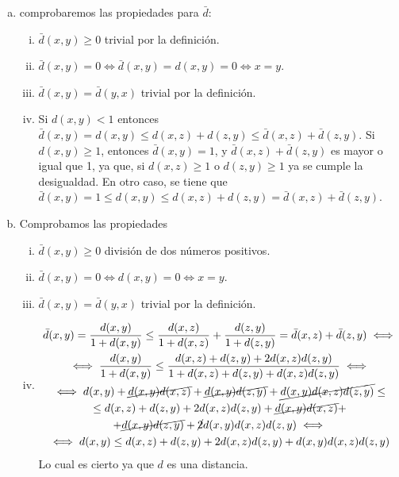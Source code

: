 \begin{ej}
	\begin{enumerate}[(a)]
		\item comprobaremos las propiedades para $\bar{d}$:
			\begin{enumerate}[i)]
				\item $\bar{d}(x,y) \geq 0$ trivial por la definición.
				\item $\bar{d}(x,y) = 0 \iff \bar{d}(x,y) = d(x,y) = 0 \iff x = y$.
				\item $\bar{d}(x,y) = \bar{d}(y,x)$ trivial por la definición.
				\item Si $d(x,y) < 1$ entonces $\bar{d}(x,y) = d(x,y) \leq d(x,z) + d(z,y) \leq \bar{d}(x,z) + \bar{d}(z,y)$. Si $d(x,y) \geq 1$,
					entonces $\bar{d}(x,y) = 1$, y $\bar{d}(x,z) + \bar{d}(z,y)$ es mayor o igual que 1, ya que, si $d(x,z) \geq 1$ o
					$d(z,y) \geq 1$ ya se cumple la desigualdad. En otro caso, se tiene que $\bar{d}(x,y) = 1 \leq d(x,y) \leq d(x,z) + d(z,y) =
					\bar{d}(x,z) + \bar{d}(z,y)$.
			\end{enumerate}
		\item Comprobamos las propiedades
			\begin{enumerate}[i)]
				\item $\bar{d}(x,y) \geq 0$ división de dos números positivos.
				\item $\bar{d}(x,y) = 0 \iff d(x,y) = 0 \iff x = y$.
				\item $\bar{d}(x,y) = \bar{d}(y,x)$ trivial por la definición.
				\item 
					\begin{gather*}
						\bar{d}(x,y) = \frac{d(x,y)}{1 + d(x,y)} \leq \frac{d(x,z)}{1 + d(x,z)} + \frac{d(z,y)}{1 + d(z,y)} =
						\bar{d}(x,z) + \bar{d}(z,y) \iff \\ \iff
						\frac{d(x,y)}{1+d(x,y)} \leq \frac{d(x,z) + d(z,y) + 2d(x,z)d(z,y)}{1 + d(x,z) + d(z,y) + d(x,z)d(z,y)} \iff \\ \iff
						d(x,y) + \cancel{d(x,y)d(x,z)} + \cancel{d(x,y)d(z,y)} + \cancel{d(x,y)d(x,z)d(z,y)} \leq \\ \leq
						d(x,z) + d(z,y) + 2d(x,z)d(z,y) + \cancel{d(x,y)d(x,z)} + \\ +\cancel{d(x,y)d(z,y)} + \cancel{2}d(x,y)d(x,z)d(z,y) \iff \\
						\iff d(x,y) \leq d(x,z) + d(z,y) + 2d(x,z)d(z,y) + d(x,y)d(x,z)d(z,y)
					\end{gather*}
					Lo cual es cierto ya que $d$ es una distancia.
			\end{enumerate}

\end{enumerate}
\end{ej}
